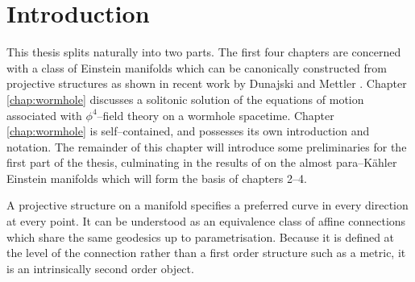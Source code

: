 

\chapter{Introduction}\label{chap:intro}


This thesis splits naturally into two parts. The first four chapters are concerned with a class of Einstein manifolds which can be canonically constructed from projective structures as shown in recent work by Dunajski and Mettler \cite{DM}. Chapter \ref{chap:wormhole} discusses a solitonic solution of the equations of motion associated with $\phi^4$--field theory on a wormhole spacetime. Chapter \ref{chap:wormhole} is self--contained, and possesses its own introduction and notation. The remainder of this chapter will introduce some preliminaries for the first part of the thesis, culminating in the results of \cite{DM} on the almost para--K\"ahler Einstein manifolds which will form the basis of chapters 2--4.

A projective structure on a manifold specifies a preferred curve in every direction at every point. It can be understood as an equivalence class of affine connections which share the same geodesics up to parametrisation. Because it is defined at the level of the connection rather than a first order structure such as a metric, it is an intrinsically second order object.

